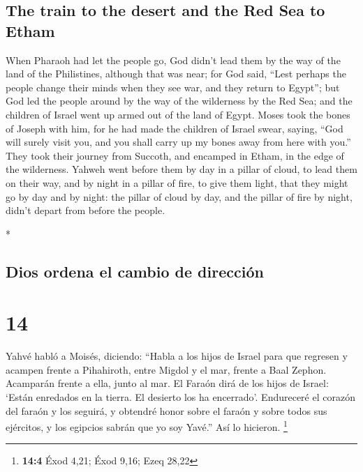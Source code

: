 \begin{paracol}{2}
\begin{otherlanguage}{english}
\hypertarget{the-train-to-the-desert-and-the-red-sea-to-etham}{%
\subsection{The train to the desert and the Red Sea to
Etham}\label{the-train-to-the-desert-and-the-red-sea-to-etham}}

 When Pharaoh had let the people go, God didn't lead them
by the way of the land of the Philistines, although that was near; for
God said, ``Lest perhaps the people change their minds when they see
war, and they return to Egypt'';  but God led the people
around by the way of the wilderness by the Red Sea; and the children of
Israel went up armed out of the land of Egypt.  Moses
took the bones of Joseph with him, for he had made the children of
Israel swear, saying, ``God will surely visit you, and you shall carry
up my bones away from here with you.''  They took their
journey from Succoth, and encamped in Etham, in the edge of the
wilderness.  Yahweh went before them by day in a pillar
of cloud, to lead them on their way, and by night in a pillar of fire,
to give them light, that they might go by day and by night:
 the pillar of cloud by day, and the pillar of fire by
night, didn't depart from before the people.

\end{otherlanguage}

\switchcolumn[0]*

\hypertarget{dios-ordena-el-cambio-de-direcciuxf3n}{%
\subsection{Dios ordena el cambio de
dirección}\label{dios-ordena-el-cambio-de-direcciuxf3n}}

\hypertarget{section-26}{%
\section{14}\label{section-26}}

 Yahvé habló a Moisés, diciendo:  ``Habla a
los hijos de Israel para que regresen y acampen frente a Pihahiroth,
entre Migdol y el mar, frente a Baal Zephon. Acamparán frente a ella,
junto al mar.  El Faraón dirá de los hijos de Israel:
`Están enredados en la tierra. El desierto los ha encerrado'.
 Endureceré el corazón del faraón y los seguirá, y
obtendré honor sobre el faraón y sobre todos sus ejércitos, y los
egipcios sabrán que yo soy Yavé.'' Así lo hicieron. \footnote{\textbf{14:4}
  Éxod 4,21; Éxod 9,16; Ezeq 28,22}


\end{paracol}
